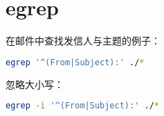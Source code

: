 \chapter{egrep}

在邮件中查找发信人与主题的例子：

\begin{lstlisting}[language=bash]
egrep '^(From|Subject):' ./*
\end{lstlisting}

忽略大小写：

\begin{lstlisting}[language=bash]
egrep -i '^(From|Subject):' ./*
\end{lstlisting}




